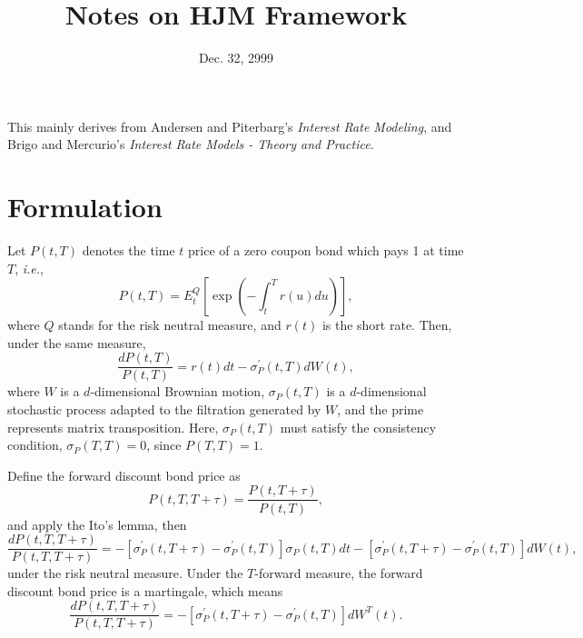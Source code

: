 \documentclass[12pt]{article}
\begin{document}
\title{Notes on HJM Framework}
\date{Dec. 32, 2999}

\maketitle

This mainly derives from Andersen and Piterbarg's {\it Interest Rate Modeling}, and Brigo and Mercurio's
{\it Interest Rate Models - Theory and Practice}.

\section{Formulation}

  Let $P(t,T)$ denotes the time $t$ price of a zero coupon bond which pays 1 at time $T$, {\it i.e.},
  \begin{equation}
    P(t,T)=E_t^Q\left[\exp\left(-\int_t^T r(u)du\right)\right],
  \end{equation}
  where $Q$ stands for the risk neutral measure, and $r(t)$ is the short rate. Then, under the same measure,
  \begin{equation}
    \label{bond1}
    \frac{dP(t,T)}{P(t,T)}=r(t)dt-\sigma_P^{\prime}(t,T)dW(t),
  \end{equation}
  where $W$ is a $d$-dimensional Brownian motion, $\sigma_P(t,T)$ is a
  $d$-dimensional stochastic process adapted to the filtration generated by $W$,
  and the prime represents matrix transposition. Here, $\sigma_P(t,T)$ must
  satisfy the consistency condition, $\sigma_P(T,T)=0$, since $P(T,T)=1$.
  
  Define the forward discount bond price as
  \begin{equation}
    P(t,T,T+\tau)=\frac{P(t,T+\tau)}{P(t,T)},
  \end{equation}
  and apply the Ito's lemma, then
  \begin{equation}
    \label{bond2}
    \frac{dP(t,T,T+\tau)}{P(t,T,T+\tau)}=-\left[\sigma_P^{\prime}(t,T+\tau)-\sigma_P^{\prime}(t,T)\right]\sigma_P(t,T)dt
                                        -\left[\sigma_P^{\prime}(t,T+\tau)-\sigma_P^{\prime}(t,T)\right]dW(t),
  \end{equation}
  under the risk neutral measure. Under the $T$-forward measure, the forward discount bond price is a martingale,
  which means
  \begin{equation}
    \label{bond3}
    \frac{dP(t,T,T+\tau)}{P(t,T,T+\tau)}=-\left[\sigma_P^{\prime}(t,T+\tau)-\sigma_P^{\prime}(t,T)\right]dW^T(t).
  \end{equation}
  
\end{document}
